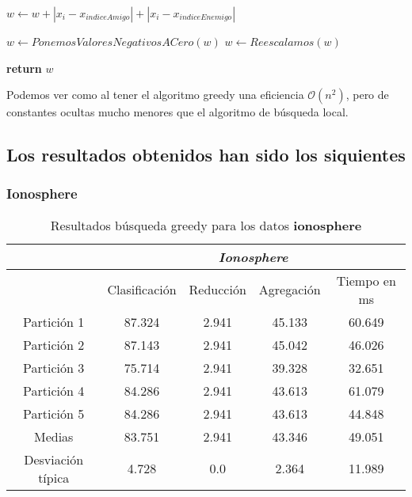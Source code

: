 \begin{algorithm}[H]
\begin{algorithmic}[1]
            \State $w \gets w + |x_i - x_{indiceAmigo}| + |x_i - x_{indiceEnemigo}|$
        \EndFor
        
        \State $w \gets PonemosValoresNegativosACero(w)$
        \State $w \gets Reescalamos(w)$
    \EndFor

    \State \textbf{return} $w$
      \EndProcedure
    \end{algorithmic}
  \end{algorithm}

  Podemos ver como al tener el algoritmo greedy 
una eficiencia $\mathcal{O}(n^2)$, pero de constantes ocultas mucho menores que el algoritmo de búsqueda local. 

  \subsection{Los resultados obtenidos han sido los siquientes}


\subsubsection{Ionosphere} 

\begin{table}[H]
  \centering
  \begin{tabular}{|c|c|c|c|c|}
    \hline
    & \multicolumn{4}{|c|}{\textit{Ionosphere}}  \\
    \hline
    &	Clasificación &		Reducción	
    &	Agregación	&	Tiempo en ms \\
    \hline
    Partición 1	&  87.324  &  2.941  &  45.133  &  60.649  \\
    Partición 2 &	 87.143  &  2.941  &  45.042  &  46.026  \\
    Partición 3 &  75.714  &  2.941  &  39.328  &  32.651  \\
    Partición 4	&  84.286  &  2.941  &  43.613  &  61.079 \\
    Partición 5	&  84.286  &  2.941  &  43.613  &  44.848  \\
    \hline
    Medias 	 &  83.751  &  2.941  &  43.346  &  49.051 \\
    \hline
    Desviación típica &	 4.728  &  0.0  &  2.364  &  11.989  \\ 
    \hline  
  \end{tabular}
  \caption{Resultados búsqueda greedy para los datos \textbf{ionosphere}}
  \label{table:greedy_ionosphere}
\end{table}

